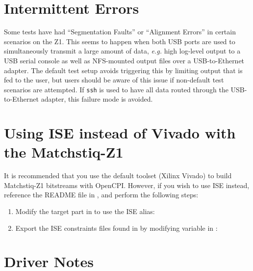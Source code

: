 \pagebreak
\begin{appendices}

\section{Intermittent Errors}
Some tests have had ``Segmentation Faults'' or ``Alignment Errors'' in certain scenarios on the Z1. This seems to happen when both USB ports are used to simultaneously transmit a large amount of data, \textit{e.g.} high log-level output to a USB serial console as well as NFS-mounted output files over a USB-to-Ethernet adapter. The default test setup avoids triggering this by limiting output that is fed to the user, but users should be aware of this issue if non-default test scenarios are attempted. If \texttt{ssh} is used to have all data routed through the USB-to-Ethernet adapter, this failure mode is avoided.
\section{Using ISE instead of Vivado with the Matchstiq-Z1}
It is recommended that you use the default toolset (Xilinx Vivado) to build Matchstiq-Z1 bitstreams with OpenCPI. However, if you wish to use ISE instead, reference the README file in , and perform the following steps:
\begin{enumerate}
\item{Modify the target part in  to use the ISE alias:
\subitem {}}
\item{Export the ISE constraints files found in  by modifying  variable in :
\subitem {}}
\end{enumerate}
\section{Driver Notes}

%
\end{appendices}

